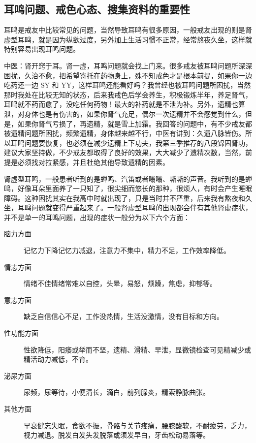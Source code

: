 \documentclass[fontset=founder]{ctexart}
\begin{document}
\subsection{耳鸣问题、戒色心态、搜集资料的重要性}

耳鸣是戒友中比较常见的问题，当然导致耳鸣有很多原因，一般戒友出现的则是肾虚型耳鸣，就是因为纵欲过度，另外加上生活习惯不正常，经常熬夜久坐，这样就特别容易出现耳鸣问题。

中医：肾开窍于耳。肾一虚，耳鸣问题就会找上门来。很多戒友被耳鸣问题所深深困扰，久治不愈，把希望寄托在药物身上，殊不知戒色才是根本前提，如果你一边吃药还一边 SY 和 YY，这样耳鸣还能看好吗？我曾经也被耳鸣问题所困扰，当然那时我处在比较无知的状态，后来我戒色后学会养生，积极锻炼半年，养足肾气，耳鸣就不药而愈了，没吃任何药物！最大的补药就是不泄为补。另外，遗精也算泄，对身体也是有伤害的，如果你肾气充足，偶尔一次遗精并不会感觉到什么，但是，如果你肾气亏损了，再遗精，就是雪上加霜。我回答的问题中，有不少戒友都被遗精问题所困扰，频繁遗精，身体越来越不行，中医有讲到：久遗八脉皆伤。所以耳鸣问题要恢复，也必须在减少遗精上下功夫，我第三季推荐的八段锦固肾功，建议大家坚持做，不少戒友都取得了良好的效果，大大减少了遗精次数，当然，前提是必须找对拉紧感，并且杜绝其他导致遗精的因素。

肾虚型耳鸣，一般患者听到的是蝉鸣、汽笛或者嗡嗡、嘶嘶的声音。我听到的是蝉鸣，好像耳朵里面养了一只知了，很尖细而悠长的那种，很烦人，有时会产生睡眠障碍。这种困扰其实在我高中时就出现了，只是当时并不严重，后来我有熬夜和久坐，耳鸣问题就变得严重起来了。一般肾虚型耳鸣的出现都会伴有其他肾虚症状，并不是单一的耳鸣问题，出现的症状一般分为以下六个方面：

\begin{description}
    \item[脑力方面] 记忆力下降记忆力减退，注意力不集中，精力不足，工作效率降低。
    \item[情志方面] 情绪不佳情绪常难以自控，头晕，易怒，烦躁，焦虑，抑郁等。
    \item[意志方面] 缺乏自信信心不足，工作没热情，生活没激情，没有目标和方向。
    \item[性功能方面] 性欲降低，阳痿或举而不坚，遗精、滑精、早泄，显微镜检查可见精减少或精活动力减低，不育。
    \item[泌尿方面] 尿频，尿等待，小便清长，滴白，前列腺炎，精索静脉曲张。
    \item[其他方面] 早衰健忘失眠，食欲不振，骨骼与关节疼痛，腰膝酸软，不耐疲劳，乏力，视力减退。脱发白发头发脱落或须发早白，牙齿松动易落等。
\end{description}
\end{document}
